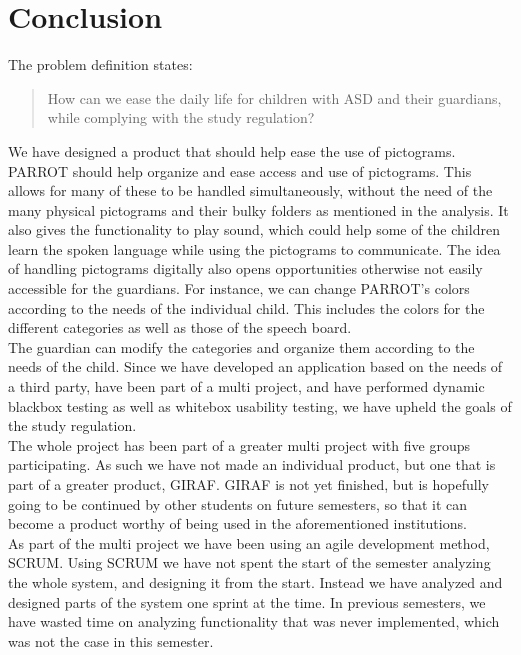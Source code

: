 \chapter{Conclusion}

The problem definition states:
\begin{quote}
How can we ease the daily life for children with ASD and their guardians, while complying with the study regulation?
\end{quote}

We have designed a product that should help ease the use of pictograms. 
PARROT should help organize and ease access and use of pictograms. This allows for many of these to be handled simultaneously, without the need of the many physical pictograms and their bulky folders as mentioned in the analysis.\newline
It also gives the functionality to play sound, which could help some of the children learn the spoken language while using the pictograms to communicate. 
The idea of handling pictograms digitally also opens opportunities otherwise not easily accessible for the guardians.
For instance, we can change PARROT's colors according to the needs of the individual child. This includes the colors for the different categories as well as those of the speech board.\newline
\\
The guardian can modify the categories and organize them according to the needs of the child.\newline
Since we have developed an application based on the needs of a third party, have been part of a multi project, and have performed dynamic blackbox testing as well as whitebox usability testing, we have upheld the goals of the study regulation.\newline
\\
The whole project has been part of a greater multi project with five groups participating. 
As such we have not made an individual product, but one that is part of a greater product, GIRAF.  
GIRAF is not yet finished, but is hopefully going to be continued by other students on future semesters, so that it can become a product worthy of being used in the aforementioned institutions.\newline
\\
As part of the multi project we have been using an agile development method, SCRUM.
Using SCRUM we have not spent the start of the semester analyzing the whole system, and designing it from the start. Instead we have analyzed and designed parts of the system one sprint at the time.
In previous semesters, we have wasted time on analyzing functionality that was never implemented, which was not the case in this semester.\newline
